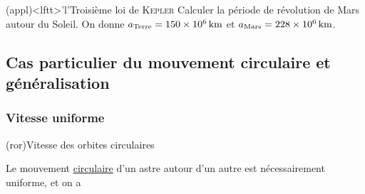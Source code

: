 \documentclass[../../main/main.tex]{subfiles}
\begin{document}
\begin{tcb*}(appl)<lftt>'l'{Troisième loi de \textsc{Kepler}}
	Calculer la période de révolution de Mars autour du Soleil. On donne $a_{\rm
				Terre} = \SI{150e6}{km}$ et $a_{\rm Mars} = \SI{228e6}{km}$.
	\tcblower
  \vspace{-30pt}
\end{tcb*}

\subsection{Cas particulier du mouvement circulaire et généralisation}
\subsubsection{Vitesse uniforme}
\begin{tcb*}[sidebyside, righthand ratio=.35](ror){Vitesse des orbites
  circulaires}
  \begin{bfseries}
    Le mouvement \ul{circulaire} d'un astre autour d'un autre
    est nécessairement uniforme, et on a
  \end{bfseries}
    \tcblower
    \psw{\[\boxed{v\ind{cercle} = \sqrt{\frac{\Gc M_S}{R}}}\]}
\end{tcb*}
\end{document}
